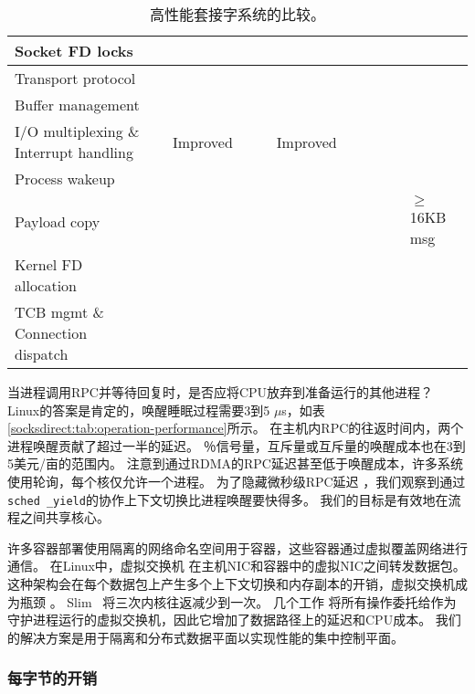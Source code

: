 \begin{sidewaystable*}[t]
{\begin{tabularx}{1.45\textwidth}{l|X|X|X|X|X|X|X|X|X|X|}
			\hline
			Socket FD locks & & & & & & & & & & \yes \\
			\hline
			Transport protocol & & & & & & & & \yes & \yes & \yes \\
			\hline
			Buffer management & & & & & & & & & & \yes \\
			\hline
			I/O multiplexing \& Interrupt handling & & Improved & \yes & \yes & Improved & \yes & \yes & \yes & \yes & \yes \\
			\hline
			Process wakeup & & & & & & & & & & \yes \\
			\hline
			Payload copy & & \yes & & & \yes & & & & & $\ge$16KB msg \\
			\hline
			Kernel FD allocation & & \yes &  &  & \yes & & & & & \yes \\
			\hline
			TCB mgmt \& Connection dispatch & \yes & \yes & \yes & \yes & \yes & & & & & \yes \\
			\hline
		\end{tabularx}
	}
	\caption{高性能套接字系统的比较。}
	\label{socksdirect:tab:related-work}
	
\end{sidewaystable*}




当进程调用RPC并等待回复时，是否应将CPU放弃到准备运行的其他进程？
Linux的答案是肯定的，唤醒睡眠过程需要3到5 $\mu$s，如表 \ref {socksdirect:tab:operation-performance}所示。
在主机内RPC的往返时间内，两个进程唤醒贡献了超过一半的延迟。
％信号量，互斥量或互斥量的唤醒成本也在3到5美元/亩的范围内。
注意到通过RDMA的RPC延迟甚至低于唤醒成本，许多系统使用轮询，每个核仅允许一个进程。
为了隐藏微秒级RPC延迟 \cite {barroso2017attack}，我们观察到通过\texttt {sched \_yield}的协作上下文切换比进程唤醒要快得多。
我们的目标是有效地在流程之间共享核心。

许多容器部署使用隔离的网络命名空间用于容器，这些容器通过虚拟覆盖网络进行通信。
在Linux中，虚拟交换机 \cite {pfaff2015design}在主机NIC和容器中的虚拟NIC之间转发数据包。
这种架构会在每个数据包上产生多个上下文切换和内存副本的开销，虚拟交换机成为瓶颈 \cite {pfefferle2015hybrid}。
Slim~ \cite {slim}将三次内核往返减少到一次。
几个工作 \cite {martins2014clickos,roghanchi2017ffwd,huang2017high,nsdi19freeflow}将所有操作委托给作为守护进程运行的虚拟交换机，因此它增加了数据路径上的延迟和CPU成本。
我们的解决方案是用于隔离和分布式数据平面以实现性能的集中控制平面。


\subsubsection{每字节的开销}
\label{socksdirect:subsec:per-byte-overhead}
\quad

